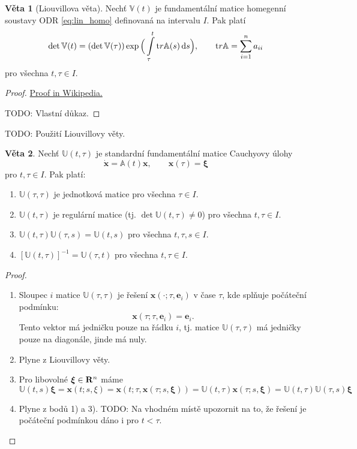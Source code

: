 \documentclass[a4paper, 12pt]{book}
\theoremstyle{definition}
\newtheorem{theorem}{Věta}[section]
\def\Real{{\rm\bf R}}
\def\d{\,{\rm d}}               %
\def\vc#1{\mathbf{\boldsymbol{#1}}}     %
\def\tn#1{{\mathbb{#1}}}    %
\def\todo#1{{\color{green}TODO:} #1}
\begin{document}
\begin{theorem}[Liouvillova věta]
     Nechť $\tn V(t)$ je fundamentální matice homegenní soustavy ODR \eqref{eq:lin_homo} definovaná na intervalu $I$.
     Pak platí
     \[
        \det{\tn V}(t) = (\det{\tn V}(\tau)) \exp \Big( \int\limits_\tau^t {\mathrm tr} \tn A(s) \d s \Big), \qquad {\mathrm tr} \tn A = \sum\limits_{i=1}^n a_{ii}
     \]
     pro všechna $t, \tau\in I$.
\end{theorem}
\begin{proof}
  \href{http://en.wikipedia.org/wiki/Liouville%27s_formula}{Proof in Wikipedia.}

  \todo{Vlastní důkaz.}
\end{proof}
\todo{Použití Liouvillovy věty.}

 
\begin{theorem}
Nechť ${\tn U}(t,\tau)$ je standardní fundamentální matice Cauchyovy úlohy
\[
    \dot{\vc x} = {\tn A}(t)\vc x,\qquad \vc x(\tau)=\vc\xi
\]
pro $t, \tau\in I$. Pak platí:
\begin{enumerate}
\item ${\tn U}(\tau,\tau)$ je jednotková matice pro všechna $\tau\in I$.
\item ${\tn U}(t,\tau)$ je regulární matice (tj. $\det{\tn U}(t,\tau)\neq 0$) pro všechna $t, \tau\in I$.
\item ${\tn U}(t,\tau){\tn U}(\tau,s)={\tn U}(t,s)$ pro všechna $t, \tau, s\in I$.
\item $[{\tn U}(t,\tau)]^{-1}={\tn U}(\tau,t)$ pro všechna $t, \tau\in I$.
\end{enumerate}
\end{theorem}
\begin{proof}
\noindent
\begin{enumerate}
 \item Sloupec $i$ matice $\tn U(\tau, \tau)$ je řešení  $\vc x( \cdot; \tau, \vc e_i)$ v čase $\tau$, kde splňuje počáteční podmínku:
 \[
    \vc x(\tau; \tau, \vc e_i) = \vc e_i.
 \]
 Tento vektor má jedničku pouze na řádku $i$, tj. matice $\tn U(\tau, \tau)$ má jedničky pouze na diagonále, jinde má nuly.
 
 \item Plyne z Liouvillovy věty. 
 
 \item Pro libovolné $\vc \xi \in \Real^n$ máme
 \[
    \tn U(t,s) \vc \xi =
    \vc x(t;s, \xi) = \vc x(t; \tau, \vc x(\tau; s, \vc \xi)) =
    \tn U(t,\tau) \vc x(\tau; s, \vc \xi) =
    \tn U(t, \tau) \tn U(\tau, s) \vc \xi    
 \]

 \item Plyne z bodů 1) a 3). \todo{Na vhodném místě upozornit na to, že řešení je počáteční podmínkou dáno i pro $t < \tau$.}
\end{enumerate}
\end{proof}
\end{document}
